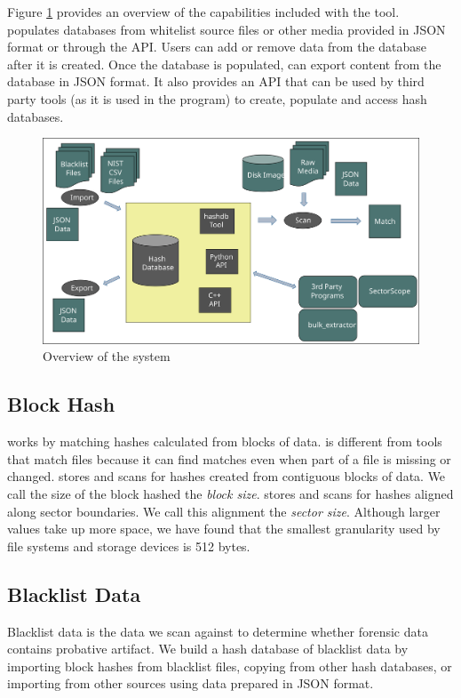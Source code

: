 \documentclass[11pt,fleqn]{article} %
\begin{document}
Figure \ref{fig:overviewFigure} provides an overview of the capabilities included with the \hdb tool. \hdb populates databases from whitelist source files
or other media provided in JSON format or through the API.
Users can add or remove data from the database after it is created.
Once the database is populated, \hdb can export content from the database in JSON format. It also provides an API that can be used by third party tools (as it is used in the \bulk program) to create, populate and access hash databases.\\

\begin{figure}
	\center
	\includegraphics[scale=.45]{drawings/hashdb_system_overview}
	\caption{Overview of the \hdb system}
	\label{fig:overviewFigure}
\end{figure}

\subsection{Block Hash}
\label{BlockHash}
\hdb works by matching hashes calculated from blocks of data.
\hdb is different from tools that match files because it can find matches
even when part of a file is missing or changed.
\hdb stores and scans for hashes created from contiguous blocks of data.
We call the size of the block hashed the \textit{block size}.
\hdb stores and scans for hashes aligned along sector boundaries.
We call this alignment the \textit{sector size}.
Although larger values take up more space, we have found that the smallest
granularity used by file systems and storage devices is 512 bytes.

\subsection{Blacklist Data}
Blacklist data is the data we scan against to determine whether forensic data
contains probative artifact.
We build a hash database of blacklist data by importing block hashes
from blacklist files, copying from other hash databases,
or importing from other sources using data prepared in JSON format.\\
\end{document}
